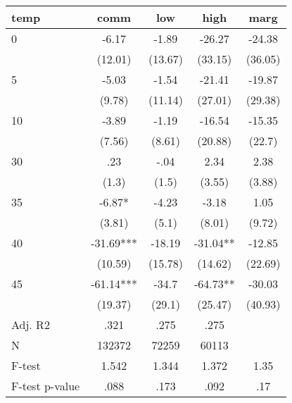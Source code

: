 \documentclass[]{article}
\begin{document}
\begin{tabular}{lcccc} \hline
temp & comm & low & high & marg \\ \hline
0 & -6.17 & -1.89 & -26.27 & -24.38 \\
 & (12.01) & (13.67) & (33.15) & (36.05) \\
5 & -5.03 & -1.54 & -21.41 & -19.87 \\
 & (9.78) & (11.14) & (27.01) & (29.38) \\
10 & -3.89 & -1.19 & -16.54 & -15.35 \\
 & (7.56) & (8.61) & (20.88) & (22.7) \\
30 & .23 & -.04 & 2.34 & 2.38 \\
 & (1.3) & (1.5) & (3.55) & (3.88) \\
35 & -6.87* & -4.23 & -3.18 & 1.05 \\
 & (3.81) & (5.1) & (8.01) & (9.72) \\
40 & -31.69*** & -18.19 & -31.04** & -12.85 \\
 & (10.59) & (15.78) & (14.62) & (22.69) \\
45 & -61.14*** & -34.7 & -64.73** & -30.03 \\
 & (19.37) & (29.1) & (25.47) & (40.93) \\
\hline Adj. R2 & .321 & .275 & .275 &  \\
N & 132372 & 72259 & 60113 &  \\
F-test & 1.542 & 1.344 & 1.372 & 1.35 \\
 F-test p-value & .088 & .173 & .092 & .17 \\ \hline
\end{tabular}
\end{document}
